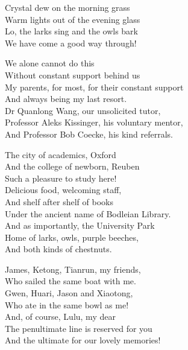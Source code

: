 \begin{acknowledgements}
	Crystal dew on the morning grass \\
	Warm lights out of the evening glass\\
	Lo, the larks sing and the owls bark\\ 
	We have come a good way through!

	We alone cannot do this\\ 
	Without constant support behind us \\ 
	My parents, for most, for their constant support\\ 
	And always being my last resort. \\ 
	Dr Quanlong Wang, our unsolicited tutor, \\ 
	Professor Aleks Kissinger, his voluntary mentor, \\ 
	And Professor Bob Coecke, his kind referrals. 

	The city of academics, Oxford \\ 
	And the college of newborn, Reuben\\ 
	Such a pleasure to study here! \\ 
	Delicious food, welcoming staff, \\ 
	And shelf after shelf of books \\ 
	Under the ancient name of Bodleian Library.\\
	And as importantly, the University Park \\ 
	Home of larks, owls, purple beeches,\\
	And both kinds of chestnuts.

	James, Ketong, Tianrun, my friends, \\ 
	Who sailed the same boat with me. \\
	Gwen, Huari, Jason and Xiaotong, \\
	Who ate in the same bowl as me! \\ 
	And, of course, Lulu, my dear \\ 
	The penultimate line is reserved for you \\ 
	And the ultimate for our lovely memories!\\
\end{acknowledgements}
